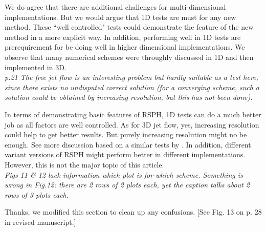 \documentclass[10pt,a4paper]{article}
\begin{document}
We do agree that there are additional challenges for multi-dimensional implementations. But we would argue that 1D tests are must for any new method. These ``well controlled" tests could demonstrate the feature of the new method in a more explicit way. In addition, performing well in 1D tests are prerequirement for be doing well in higher dimensional implementations. We observe that many numerical schemes were throughly discussed in 1D and then implemented in 3D.
\\[3pt]

\textit{p.21 The free jet flow is an interesting problem but hardly suitable as a
test here, since there exists no undisputed correct solution (for a converging scheme, such a solution could be obtained by increasing resolution, but this has not been done).}

In terms of demonstrating basic features of RSPH, 1D tests can do a much better job as all factors are well controlled. 
As for 3D jet flow, yes, increasing resolution could help to get better results. But purely increasing resolution might no be enough. See more discussion based on a similar tests by \citet{cha2010kelvin}. 
In addition, different variant versions of RSPH might perform better in different implementations. However, this is not the major topic of this article.
\\[3pt]

\textit{Figs 11 \& 12 lack information which plot is for which scheme. Something is wrong in Fig.12: there are 2 rows of 2 plots each, yet the caption
talks about 2 rows of 3 plots each.}

Thanks, we modified this section to clean up any confusions.
[See Fig. 13 on p. 28 in revised manuscript.]
\\[3pt]


\end{document}
